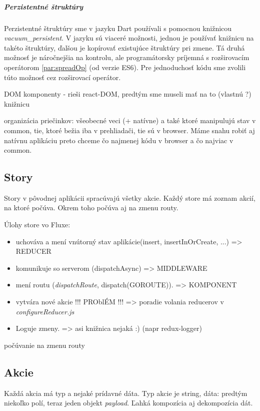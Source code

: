 \subparagraph{Perzistentné štruktúry}%
Perzistentné štruktúry sme v jazyku Dart používali s pomocnou knižnicou \emph{vacuum\_persistent}. V jazyku \JS{} sú viaceré možnosti, jednou je používať knižnicu na takéto štruktúry, ďalšou je kopírovať existujúce štruktúry pri zmene. Tá druhá možnosť je náročnejšia na kontrolu, ale programátorsky príjemná s rozširovacím operátorom \ref{par:spreadOp} (od verzie ES6). Pre jednoduchosť kódu sme zvolili túto možnosť cez rozširovací operátor.


\TODO{}
DOM komponenty - rieši react-DOM, predtým sme museli mať na to (vlastnú ?) knižnicu

organizácia priečinkov: všeobecné veci (+ natívne) a také ktoré manipulujú stav v common, tie, ktoré bežia iba v prehliadači, tie sú v browser. Máme snahu robiť aj natívnu aplikáciu %
preto chceme čo najmenej kódu v browser a čo najviac v common.

\subsection{Story}
Story v pôvodnej aplikácii spracúvajú všetky akcie. Každý store má zoznam akcií, na ktoré počúva. Okrem toho počúva aj na zmenu routy.

Úlohy store vo Fluxe:
\begin{itemize}
\item uchováva a mení vnútorný stav aplikácie(insert, insertInOrCreate, ...) => REDUCER
\item komunikuje so serverom (dispatchAsync) => MIDDLEWARE
\item mení routu (\emph{dispatchRoute}, dispatch(GOROUTE)). => KOMPONENT
\item vytvára nové akcie !!! PROblÉM !!! => poradie volania reducerov %
v \emph{configureReducer.js}
\item Loguje zmeny. => asi knižnica nejaká :) (napr redux-logger)
\end{itemize}

počúvanie na zmenu routy

\subsection{Akcie}
Každá akcia má typ a nejaké prídavné dáta. %
Typ akcie je string, dáta: predtým niekoľko polí, teraz jeden objekt \emph{payload}. Ľahká kompozícia aj dekompozícia dát. %

